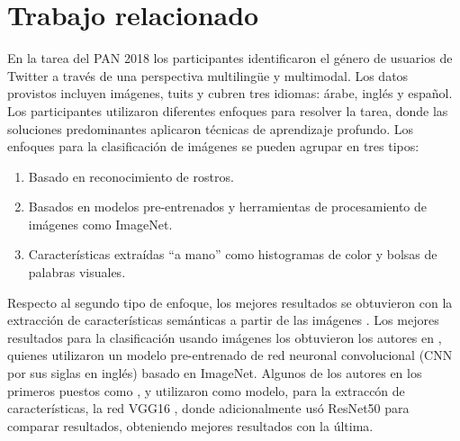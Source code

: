 \documentclass[runningheads]{llncs}
\begin{document}
\section{Trabajo relacionado}

En la tarea del PAN 2018 los participantes identificaron el género
de usuarios de Twitter a través de una perspectiva multilingüe y multimodal. Los
datos provistos incluyen imágenes, tuits y cubren tres idiomas: árabe, inglés y
español. Los participantes utilizaron diferentes enfoques para resolver la tarea,
donde las soluciones predominantes aplicaron técnicas de aprendizaje profundo.
Los enfoques para la clasificación de imágenes se pueden agrupar en tres tipos:
\begin{enumerate}
    \item Basado en reconocimiento de rostros.
    \item Basados en modelos pre-entrenados y herramientas de procesamiento de
    imágenes como ImageNet.
    \item Características extraídas ``a mano'' como histogramas de color y bolsas 
    de palabras visuales.
\end{enumerate}

Respecto al segundo tipo de enfoque, los mejores resultados se obtuvieron 
con la extracción de características semánticas a partir de las 
imágenes \cite{rangel_rosso_montes-y-gomez_potthast_stein}.
Los mejores resultados para la clasificación usando imágenes los obtuvieron los
autores en \cite{takahashi_tahara_nagatan_miura_taniguchi_ohkuma}, quienes utilizaron 
un modelo pre-entrenado de red neuronal convolucional (CNN por sus siglas en inglés) 
basado en ImageNet. Algunos de los autores en los primeros puestos como \cite{aragon2018straightforward}, 
\cite{takahashi_tahara_nagatan_miura_taniguchi_ohkuma} y \cite{sierra_gonzales} utilizaron como modelo, para la extraccón de características, la red VGG16 \cite{zisserman_simonyan_2015}, donde \cite{sierra_gonzales} adicionalmente usó ResNet50 \cite{7780459} para comparar resultados, obteniendo mejores resultados con la última.
\end{document}
